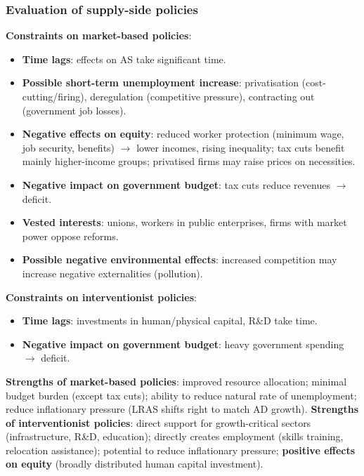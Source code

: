 \documentclass[a4paper,12pt]{article}
\begin{document}
\subsubsection*{Evaluation of supply-side policies}
\textbf{Constraints on market-based policies}:
\begin{itemize}
  \item \textbf{Time lags}: effects on AS take significant time.
  \item \textbf{Possible short-term unemployment increase}: privatisation (cost-cutting/firing), deregulation (competitive pressure), contracting out (government job losses).
  \item \textbf{Negative effects on equity}: reduced worker protection (minimum wage, job security, benefits) $\to$ lower incomes, rising inequality; tax cuts benefit mainly higher-income groups; privatised firms may raise prices on necessities.
  \item \textbf{Negative impact on government budget}: tax cuts reduce revenues $\to$ deficit.
  \item \textbf{Vested interests}: unions, workers in public enterprises, firms with market power oppose reforms.
  \item \textbf{Possible negative environmental effects}: increased competition may increase negative externalities (pollution).
\end{itemize}
\textbf{Constraints on interventionist policies}:
\begin{itemize}
  \item \textbf{Time lags}: investments in human/physical capital, R\&D take time.
  \item \textbf{Negative impact on government budget}: heavy government spending $\to$ deficit.
\end{itemize}
\textbf{Strengths of market-based policies}: improved resource allocation; minimal budget burden (except tax cuts); ability to reduce natural rate of unemployment; reduce inflationary pressure (LRAS shifts right to match AD growth).
\textbf{Strengths of interventionist policies}: direct support for growth-critical sectors (infrastructure, R\&D, education); directly creates employment (skills training, relocation assistance); potential to reduce inflationary pressure; \textbf{positive effects on equity} (broadly distributed human capital investment).
\end{document}
